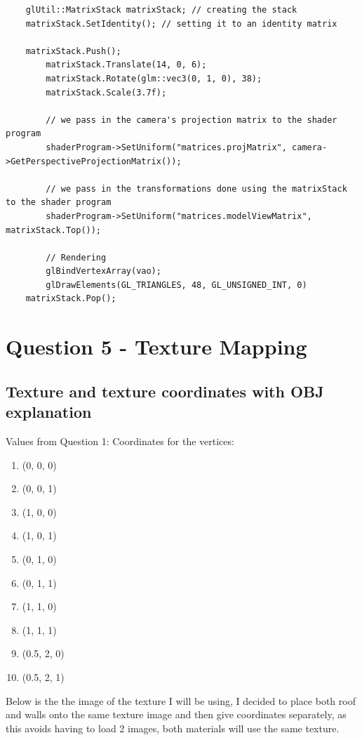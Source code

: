 \documentclass[10pt]{report}
\begin{document}
\begin{lstlisting}
    glUtil::MatrixStack matrixStack; // creating the stack
    matrixStack.SetIdentity(); // setting it to an identity matrix

    matrixStack.Push();
        matrixStack.Translate(14, 0, 6);
        matrixStack.Rotate(glm::vec3(0, 1, 0), 38);
        matrixStack.Scale(3.7f);

        // we pass in the camera's projection matrix to the shader program
        shaderProgram->SetUniform("matrices.projMatrix", camera->GetPerspectiveProjectionMatrix());

        // we pass in the transformations done using the matrixStack to the shader program
        shaderProgram->SetUniform("matrices.modelViewMatrix", matrixStack.Top());

        // Rendering 
        glBindVertexArray(vao);
        glDrawElements(GL_TRIANGLES, 48, GL_UNSIGNED_INT, 0)
    matrixStack.Pop();

\end{lstlisting}


\chapter{Question 5 - Texture Mapping}

\section{Texture and texture coordinates with OBJ explanation}

Values from Question 1:
Coordinates for the vertices:
\begin{enumerate}[(1)]
    \item (0, 0, 0) %
    \item (0, 0, 1) %
    \item (1, 0, 0) %
    \item (1, 0, 1) %
    \item (0, 1, 0) %
    \item (0, 1, 1) %
    \item (1, 1, 0) %
    \item (1, 1, 1) %
    \item (0.5, 2, 0) %
    \item (0.5, 2, 1) %
\end{enumerate}

Below is the the image of the texture I will be using, I decided to place both roof and walls onto the same texture image and then give coordinates separately, as this avoids having to load 2 images, both materials will use the same texture.
\end{document}
